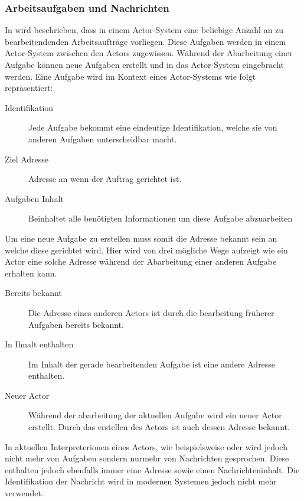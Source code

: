 \subsubsection{Arbeitsaufgaben und Nachrichten}\label{actors:messages}
In \cite{Agha1985ActorsSystems} wird beschrieben, dass in einem Actor-System eine beliebige Anzahl an zu bearbeitendenden Arbeitsaufträge vorliegen. Diese Aufgaben werden in einem Actor-System zwischen den Actors zugewissen. Während der Abarbeitung einer Aufgabe können neue Aufgaben erstellt und in das Actor-System eingebracht werden. Eine Aufgabe wird im Kontext eines Actor-Systems wie folgt repräsentiert:
\begin{description}
    \item[Identifikation] Jede Aufgabe bekommt eine eindeutige Identifikation, welche sie von anderen Aufgaben unterscheidbar macht.
    \item[Ziel Adresse] Adresse an wenn der Auftrag gerichtet ist.
    \item[Aufgaben Inhalt] Beinhaltet alle benötigten Informationen um diese Aufgabe abzuarbeiten
\end{description} 
Um eine neue Aufgabe zu erstellen muss somit die Adresse bekannt sein an welche diese gerichtet wird. Hier wird von \cite{Agha1985ActorsSystems} drei mögliche Wege aufzeigt wie ein Actor eine solche Adresse während der Abarbeitung einer anderen Aufgabe erhalten kann.
\begin{description}
    \item[Bereits bekannt] Die Adresse eines anderen Actors ist durch die bearbeitung früherer Aufgaben bereits bekannt.
    \item[In Ihnalt enthalten] Im Inhalt der gerade bearbeitenden Aufgabe ist eine andere Adresse enthalten.
    \item[Neuer Actor] Während der abarbeitung der aktuellen Aufgabe wird ein neuer Actor erstellt. Durch das erstellen des Actors ist auch dessen Adresse bekannt.
\end{description}
In aktuellen Interpreterionen eines Actors, wie beispielsweise \cite{Vernon2015ReactiveAkka} oder \cite{Brown2016ReactiveAkka.net.} wird jedoch nicht mehr von Aufgaben sondern nurmehr von Nachrichten gesprochen. Diese enthalten jedoch ebenfalls immer eine Adresse sowie einen Nachrichteninhalt. Die Identifikation der Nachricht wird in modernen Systemen jedoch nicht mehr verwendet. \\
